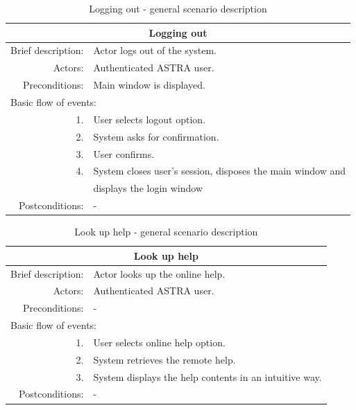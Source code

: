 \begin{table}[h!]
	\small
    \begin{center}
		\begin{tabular}{||r|l||}
		\hline \hline
		\multicolumn{2}{||c||}{\bfseries{Logging out}} \\
		\hline
		\hline 
		Brief description: & Actor logs out of the system. \\
		\hline
		Actors: & Authenticated ASTRA user. \\
		\hline
		Preconditions: &  Main window is displayed. \\
		\hline \hline
		\multicolumn{2}{||l||}{Basic flow of events:} \\
		\hline \hline
			1. & User selects logout option. \\
			2. & System asks for confirmation. \\
			3. & User confirms. \\ 
			4. & System closes user's session, disposes the main window and \\
			   & displays the login window \\ 
		\hline \hline Postconditions: &  - \\
		\hline \hline
		\end{tabular}
		\caption{\label{table:logout}Logging out - general scenario description}
	\end{center}
\end{table}

\begin{table}[h!]
	\small
    \begin{center}
		\begin{tabular}{||r|l||}
		\hline \hline
		\multicolumn{2}{||c||}{\bfseries{Look up help}} \\
		\hline
		\hline 
		Brief description: & Actor looks up the online help. \\
		\hline
		Actors: & Authenticated ASTRA user. \\
		\hline
		Preconditions: &  -  \\
		\hline \hline
		\multicolumn{2}{||l||}{Basic flow of events:} \\
		\hline \hline
			1. & User selects online help option. \\
			2. & System retrieves the remote help. \\
			3. & System displays the help contents in an intuitive way. \\ 
			\hline \hline
		Postconditions: &  - \\
		\hline \hline
		\end{tabular}
		\caption{\label{table:help}Look up help - general scenario description}
	\end{center}
\end{table}